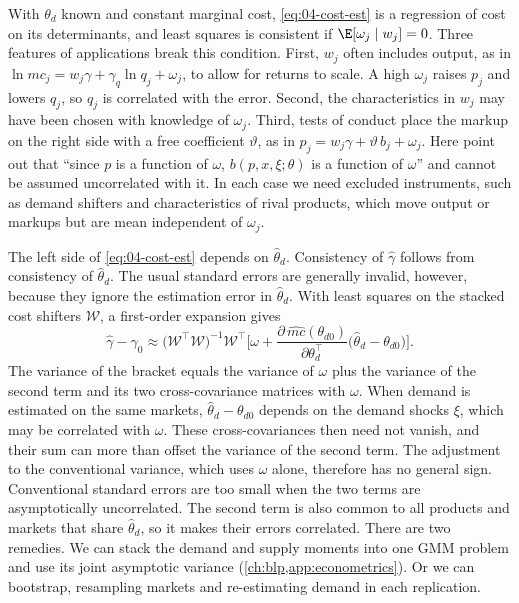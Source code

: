 With $\theta_d$ known and constant marginal cost, \eqref{eq:04-cost-est} is a regression of cost on its
determinants, and least squares is consistent if $\E[\omega_j \mid w_j] = 0$. Three features of applications
break this condition. First, $w_j$ often includes output, as in $\ln mc_j = w_j\gamma + \gamma_q\ln q_j + \omega_j$,
to allow for returns to scale. A high $\omega_j$ raises $p_j$ and lowers $q_j$, so $q_j$ is correlated with the
error. Second, the characteristics in $w_j$ may have been chosen with knowledge of $\omega_j$. Third, tests of
conduct place the markup on the right side with a free coefficient $\vartheta$, as in $p_j = w_j\gamma +
\vartheta\, b_j + \omega_j$. Here \citet[p.~854]{BerryLevinsohnPakes1995} point out that ``since $p$ is a function of $\omega$,
$b(p, x, \xi; \theta)$ is a function of $\omega$'' and cannot be assumed uncorrelated with it. In each case we
need excluded instruments, such as demand shifters and characteristics of rival products, which move output or
markups but are mean independent of $\omega_j$.

The left side of \eqref{eq:04-cost-est} depends on $\hat\theta_d$. Consistency of $\hat\gamma$ follows from
consistency of $\hat\theta_d$. The usual standard errors are generally invalid, however, because they ignore the
estimation error in $\hat\theta_d$. With least squares on the stacked cost shifters $\mathcal{W}$, a first-order expansion gives
\begin{equation}\label{eq:04-generated}
\hat\gamma - \gamma_0 \approx \big(\mathcal{W}^\top \mathcal{W}\big)^{-1}\mathcal{W}^\top\Big[\omega + \frac{\partial\,\widehat{mc}(\theta_{d0})}
{\partial\theta_d^\top}\big(\hat\theta_d - \theta_{d0}\big)\Big].
\end{equation}
The variance of the bracket equals the variance of $\omega$ plus the variance of the second term and its two
cross-covariance matrices with $\omega$. When demand is estimated on the same markets, $\hat\theta_d - \theta_{d0}$
depends on the demand shocks $\xi$, which may be correlated with $\omega$. These cross-covariances then need not
vanish, and their sum can more than offset the variance of the second term. The adjustment to the conventional
variance, which uses $\omega$ alone, therefore has no general sign. Conventional standard errors are too small when
the two terms are asymptotically uncorrelated. The second term is also common to all products and markets that share $\hat\theta_d$, so it makes
their errors correlated. There are two remedies. We can stack the demand and supply moments into one GMM problem and use its joint
asymptotic variance (\cref{ch:blp,app:econometrics}). Or we can bootstrap, resampling markets and re-estimating
demand in each replication.

